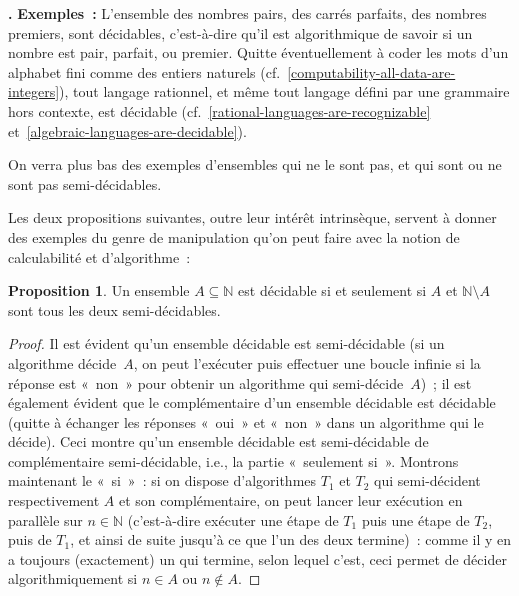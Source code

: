 \documentclass[12pt,a4paper]{article}
\theoremstyle{definition}
\newcommand\thingy{%
\refstepcounter{comcnt}\medskip\noindent\textbf{\thecomcnt.} }
\newtheorem{prop}[comcnt]{Proposition}
\begin{document}
\thingy\textbf{Exemples :} L'ensemble des nombres pairs, des carrés
parfaits, des nombres premiers, sont décidables, c'est-à-dire qu'il
est algorithmique de savoir si un nombre est pair, parfait, ou
premier.  Quitte éventuellement à coder les mots d'un alphabet fini
comme des entiers naturels
(cf. \ref{computability-all-data-are-integers}), tout langage
rationnel, et même tout langage défini par une grammaire hors
contexte, est décidable (cf. \ref{rational-languages-are-recognizable}
et \ref{algebraic-languages-are-decidable}).

On verra plus bas des exemples d'ensembles qui ne le sont pas, et qui
sont ou ne sont pas semi-décidables.

\medbreak

Les deux propositions suivantes, outre leur intérêt intrinsèque,
servent à donner des exemples du genre de manipulation qu'on peut
faire avec la notion de calculabilité et d'algorithme :

\begin{prop}\label{decidable-iff-semidecidable-and-complement}
Un ensemble $A \subseteq \mathbb{N}$ est décidable si et seulement si
$A$ et $\mathbb{N}\setminus A$ sont tous les deux semi-décidables.
\end{prop}
\begin{proof}
Il est évident qu'un ensemble décidable est semi-décidable (si un
algorithme décide $A$, on peut l'exécuter puis effectuer une boucle
infinie si la réponse est « non » pour obtenir un algorithme qui
semi-décide $A$) ; il est également évident que le complémentaire d'un
ensemble décidable est décidable (quitte à échanger les réponses
« oui » et « non » dans un algorithme qui le décide).  Ceci montre
qu'un ensemble décidable est semi-décidable de complémentaire
semi-décidable, i.e., la partie « seulement si ».  Montrons maintenant
le « si » : si on dispose d'algorithmes $T_1$ et $T_2$ qui
semi-décident respectivement $A$ et son complémentaire, on peut lancer
leur exécution en parallèle sur $n \in \mathbb{N}$ (c'est-à-dire
exécuter une étape de $T_1$ puis une étape de $T_2$, puis de $T_1$, et
ainsi de suite jusqu'à ce que l'un des deux termine) : comme il y en a
toujours (exactement) un qui termine, selon lequel c'est, ceci permet
de décider algorithmiquement si $n \in A$ ou $n \not\in A$.
\end{proof}
\end{document}
